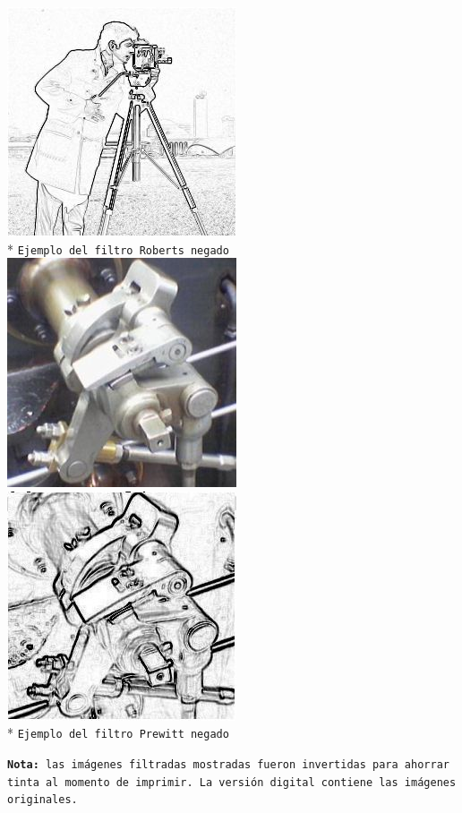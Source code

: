 \begin{center}
\includegraphics[scale=0.5]{imgs/cameraman-roberts-neg.jpg} \\*
\texttt{\small Ejemplo del filtro Roberts negado }\\
\vspace{1.0cm}
\includegraphics[scale=0.5]{imgs/steam-engine.jpg}
\includegraphics[scale=0.5]{imgs/steam-engine-prewitt-neg.jpg} \\*
\texttt{\small Ejemplo del filtro Prewitt negado } \\
\end{center}
\vspace{1cm}
\texttt{\small \textbf{Nota:} las im\'agenes filtradas mostradas fueron invertidas para ahorrar tinta al momento de imprimir. La versi\'on digital contiene las im\'agenes originales.}
\pagebreak
